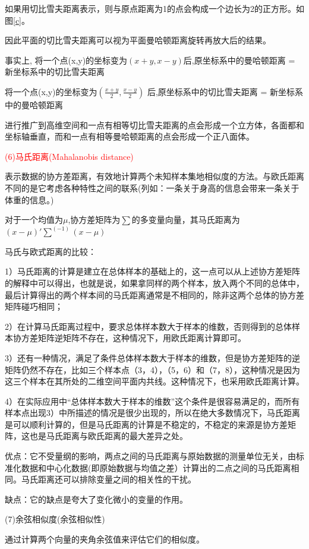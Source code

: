 \documentclass[openbib]{article}
\begin{document}
如果用切比雪夫距离表示，则与原点距离为1的点会构成一个边长为2的正方形。如图\ref{c}。

因此平面的切比雪夫距离可以视为平面曼哈顿距离旋转再放大后的结果。

事实上,
将一个点(x,y)的坐标变为$(x+y,x−y)$后,原坐标系中的曼哈顿距离 = 新坐标系中的切比雪夫距离

将一个点(x,y)的坐标变为$(\frac{x+y}{2},\frac{x−y}{2})$ 后,原坐标系中的切比雪夫距离 = 新坐标系中的曼哈顿距离

进行推广到高维空间和一点有相等切比雪夫距离的点会形成一个立方体，各面都和坐标轴垂直，而和一点有相等曼哈顿距离的点会形成一个正八面体。

\textcolor{red}{(6)马氏距离(Mahalanobis distance)}

表示数据的协方差距离，有效地计算两个未知样本集地相似度的方法。与欧氏距离不同的是它考虑各种特性之间的联系(列如：一条关于身高的信息会带来一条关于体重的信息。)

对于一个均值为$\mu$,协方差矩阵为$\sum$的多变量向量，其马氏距离为$(x-\mu)'\sum ^{(-1)}(x-\mu)$

马氏与欧式距离的比较：

1）马氏距离的计算是建立在总体样本的基础上的，这一点可以从上述协方差矩阵的解释中可以得出，也就是说，如果拿同样的两个样本，放入两个不同的总体中，最后计算得出的两个样本间的马氏距离通常是不相同的，除非这两个总体的协方差矩阵碰巧相同；

2）在计算马氏距离过程中，要求总体样本数大于样本的维数，否则得到的总体样本协方差矩阵逆矩阵不存在，这种情况下，用欧氏距离计算即可。

3）还有一种情况，满足了条件总体样本数大于样本的维数，但是协方差矩阵的逆矩阵仍然不存在，比如三个样本点（3，4），（5，6）和（7，8），这种情况是因为这三个样本在其所处的二维空间平面内共线。这种情况下，也采用欧氏距离计算。

4）在实际应用中“总体样本数大于样本的维数”这个条件是很容易满足的，而所有样本点出现3）中所描述的情况是很少出现的，所以在绝大多数情况下，马氏距离是可以顺利计算的，但是马氏距离的计算是不稳定的，不稳定的来源是协方差矩阵，这也是马氏距离与欧氏距离的最大差异之处。

优点：它不受量纲的影响，两点之间的马氏距离与原始数据的测量单位无关，由标准化数据和中心化数据(即原始数据与均值之差）计算出的二点之间的马氏距离相同。马氏距离还可以排除变量之间的相关性的干扰。

缺点：它的缺点是夸大了变化微小的变量的作用。

(7)余弦相似度(余弦相似性)

通过计算两个向量的夹角余弦值来评估它们的相似度。
\end{document}
